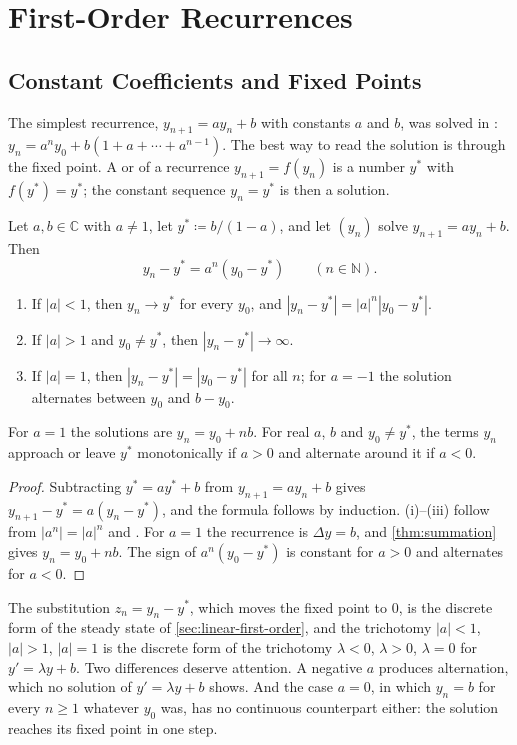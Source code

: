 \section{First-Order Recurrences}
\label{sec:first-order-recurrences}

\subsection{Constant Coefficients and Fixed Points}

The simplest recurrence, $y_{n+1}=ay_n+b$ with constants $a$ and $b$, was solved in : $y_n=a^ny_0+b(1+a+\cdots+a^{n-1})$. The best way to read the solution is through the fixed point. A  or  of a recurrence $y_{n+1}=f(y_n)$ is a number $y^*$ with $f(y^*)=y^*$; the constant sequence $y_n=y^*$ is then a solution.

\begin{proposition}
\label{prop:first-order-constant}
Let $a,b\in\mathbb C$ with $a\ne1$, let $y^*\coloneqq b/(1-a)$, and let $(y_n)$ solve $y_{n+1}=ay_n+b$. Then
\[
y_n-y^*=a^n(y_0-y^*)\qquad(n\in\mathbb N).
\]
\begin{enumerate}
\item If $|a|<1$, then $y_n\to y^*$ for every $y_0$, and $|y_n-y^*|=|a|^n|y_0-y^*|$.
\item If $|a|>1$ and $y_0\ne y^*$, then $|y_n-y^*|\to\infty$.
\item If $|a|=1$, then $|y_n-y^*|=|y_0-y^*|$ for all $n$; for $a=-1$ the solution alternates between $y_0$ and $b-y_0$.
\end{enumerate}
For $a=1$ the solutions are $y_n=y_0+nb$. For real $a$, $b$ and $y_0\ne y^*$, the terms $y_n$ approach or leave $y^*$ monotonically if $a>0$ and alternate around it if $a<0$.
\end{proposition}

\begin{proof}
Subtracting $y^*=ay^*+b$ from $y_{n+1}=ay_n+b$ gives $y_{n+1}-y^*=a(y_n-y^*)$, and the formula follows by induction. (i)--(iii) follow from $|a^n|=|a|^n$ and . For $a=1$ the recurrence is $\Delta y=b$, and \cref{thm:summation} gives $y_n=y_0+nb$. The sign of $a^n(y_0-y^*)$ is constant for $a>0$ and alternates for $a<0$.
\end{proof}

The substitution $z_n=y_n-y^*$, which moves the fixed point to $0$, is the discrete form of the steady state of \cref{sec:linear-first-order}, and the trichotomy $|a|<1$, $|a|>1$, $|a|=1$ is the discrete form of the trichotomy $\lambda<0$, $\lambda>0$, $\lambda=0$ for $y'=\lambda y+b$. Two differences deserve attention. A negative $a$ produces alternation, which no solution of $y'=\lambda y+b$ shows. And the case $a=0$, in which $y_n=b$ for every $n\ge1$ whatever $y_0$ was, has no continuous counterpart either: the solution reaches its fixed point in one step.

